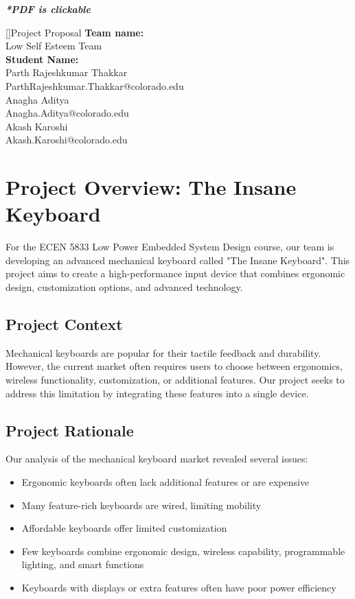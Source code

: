 \documentclass[a4paper,11pt]{article}%
\begin{document}


\pagebreak

\tableofcontents
\listoffigures
\listoftables
\vfill
\begin{center}
    \textbf{\textit{*PDF is clickable}}
\end{center}

\pagebreak

[]{Project Proposal}
\textbf{Team name:}\\
Low Self Esteem Team\\

\textbf{Student Name:}\\
Parth Rajeshkumar Thakkar\\
ParthRajeshkumar.Thakkar@colorado.edu\\

Anagha Aditya\\
Anagha.Aditya@colorado.edu\\

Akash Karoshi\\
Akash.Karoshi@colorado.edu\\


\section{Project Overview: The Insane Keyboard}
For the ECEN 5833 Low Power Embedded System Design course, our team is developing an advanced mechanical keyboard called "The Insane Keyboard". This project aims to create a high-performance input device that combines ergonomic design, customization options, and advanced technology.
\subsection{Project Context}
Mechanical keyboards are popular for their tactile feedback and durability. However, the current market often requires users to choose between ergonomics, wireless functionality, customization, or additional features. Our project seeks to address this limitation by integrating these features into a single device.
\subsection{Project Rationale}
Our analysis of the mechanical keyboard market revealed several issues:
\begin{itemize}
    \item Ergonomic keyboards often lack additional features or are expensive
    \item Many feature-rich keyboards are wired, limiting mobility
    \item Affordable keyboards offer limited customization
    \item Few keyboards combine ergonomic design, wireless capability, programmable lighting, and smart functions
    \item Keyboards with displays or extra features often have poor power efficiency
\end{itemize}
\end{document}
